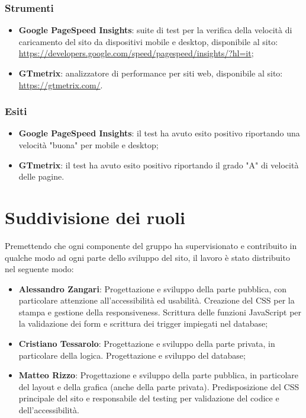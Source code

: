 \documentclass[12pt]{article}
\begin{document}
	\subsubsection{Strumenti}
	
	\begin{itemize}
		\item \textbf{Google PageSpeed Insights}: suite di test per la verifica della velocità di caricamento del sito da dispositivi mobile e desktop, disponibile al sito:
		\\ \url{https://developers.google.com/speed/pagespeed/insights/?hl=it};
		
		\item \textbf{GTmetrix}: analizzatore di performance per siti web, disponibile al sito:
		\\ \url{https://gtmetrix.com/}.
	\end{itemize}
	
	\subsubsection{Esiti}
	
	\begin{itemize}
		\item \textbf{Google PageSpeed Insights}: il test ha avuto esito positivo riportando una velocità "buona" per mobile e desktop;
		
		\item \textbf{GTmetrix}: il test ha avuto esito positivo riportando il grado "A" di velocità delle pagine. 
	\end{itemize}

\newpage
\appendix

	\section{Suddivisione dei ruoli}
	
	Premettendo che ogni componente del gruppo ha supervisionato e contribuito in qualche modo ad ogni parte dello sviluppo del sito, il lavoro è stato distribuito nel seguente modo:
	
	\begin{itemize}
		\item \textbf{Alessandro Zangari}: Progettazione e sviluppo della parte pubblica, con particolare attenzione all'accessibilità ed usabilità. Creazione del CSS per la stampa e gestione della responsiveness. Scrittura delle funzioni JavaScript per la validazione dei form e scrittura dei trigger impiegati nel database;
		\item \textbf{Cristiano Tessarolo}: Progettazione e sviluppo della parte privata, in particolare della logica. Progettazione e sviluppo del database;
		\item \textbf{Matteo Rizzo}: Progettazione e sviluppo della parte pubblica, in particolare del layout e della grafica (anche della parte privata). Predisposizione del CSS principale del sito e responsabile del testing per validazione del codice e dell'accessibilità.
	\end{itemize}
	
\end{document}
